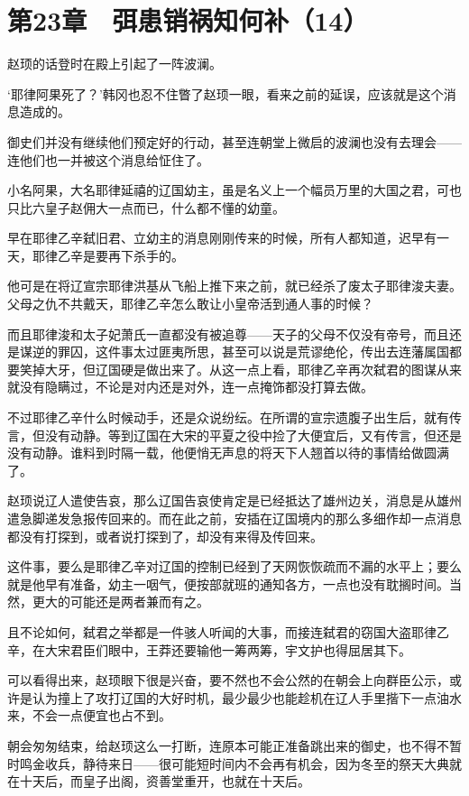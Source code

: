 \section{第23章　弭患销祸知何补（14）}

赵顼的话登时在殿上引起了一阵波澜。

‘耶律阿果死了？’韩冈也忍不住瞥了赵顼一眼，看来之前的延误，应该就是这个消息造成的。

御史们并没有继续他们预定好的行动，甚至连朝堂上微启的波澜也没有去理会——连他们也一并被这个消息给怔住了。

小名阿果，大名耶律延禧的辽国幼主，虽是名义上一个幅员万里的大国之君，可也只比六皇子赵佣大一点而已，什么都不懂的幼童。

早在耶律乙辛弑旧君、立幼主的消息刚刚传来的时候，所有人都知道，迟早有一天，耶律乙辛是要再下杀手的。

他可是在将辽宣宗耶律洪基从飞船上推下来之前，就已经杀了废太子耶律浚夫妻。父母之仇不共戴天，耶律乙辛怎么敢让小皇帝活到通人事的时候？

而且耶律浚和太子妃萧氏一直都没有被追尊——天子的父母不仅没有帝号，而且还是谋逆的罪囚，这件事太过匪夷所思，甚至可以说是荒谬绝伦，传出去连藩属国都要笑掉大牙，但辽国硬是做出来了。从这一点上看，耶律乙辛再次弑君的图谋从来就没有隐瞒过，不论是对内还是对外，连一点掩饰都没打算去做。

不过耶律乙辛什么时候动手，还是众说纷纭。在所谓的宣宗遗腹子出生后，就有传言，但没有动静。等到辽国在大宋的平夏之役中捡了大便宜后，又有传言，但还是没有动静。谁料到时隔一载，他便悄无声息的将天下人翘首以待的事情给做圆满了。

赵顼说辽人遣使告哀，那么辽国告哀使肯定是已经抵达了雄州边关，消息是从雄州遣急脚递发急报传回来的。而在此之前，安插在辽国境内的那么多细作却一点消息都没有打探到，或者说打探到了，却没有来得及传回来。

这件事，要么是耶律乙辛对辽国的控制已经到了天网恢恢疏而不漏的水平上；要么就是他早有准备，幼主一咽气，便按部就班的通知各方，一点也没有耽搁时间。当然，更大的可能还是两者兼而有之。

且不论如何，弑君之举都是一件骇人听闻的大事，而接连弑君的窃国大盗耶律乙辛，在大宋君臣们眼中，王莽还要输他一筹两筹，宇文护也得屈居其下。

可以看得出来，赵顼眼下很是兴奋，要不然也不会公然的在朝会上向群臣公示，或许是认为撞上了攻打辽国的大好时机，最少最少也能趁机在辽人手里揩下一点油水来，不会一点便宜也占不到。

朝会匆匆结束，给赵顼这么一打断，连原本可能正准备跳出来的御史，也不得不暂时鸣金收兵，静待来日——很可能短时间内不会再有机会，因为冬至的祭天大典就在十天后，而皇子出阁，资善堂重开，也就在十天后。

